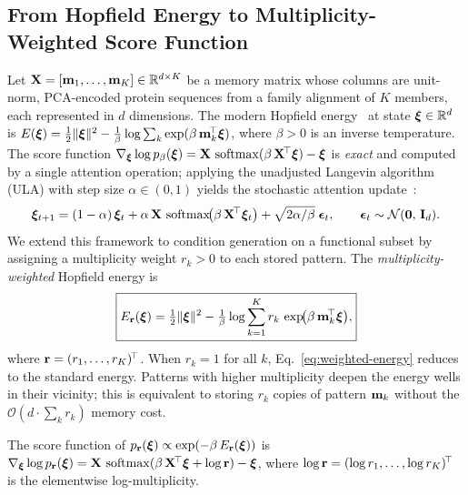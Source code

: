 \subsection{From Hopfield Energy to Multiplicity-Weighted Score Function}\label{sec:theory}

Let $\mathbf{X} = [\mathbf{m}_1, \ldots, \mathbf{m}_K] \in \mathbb{R}^{d \times K}$ be a memory matrix whose columns are
unit-norm, PCA-encoded protein sequences from a family alignment of $K$ members, each represented
in $d$ dimensions. The modern Hopfield energy~\cite{ramsauerHopfieldNetworksAll2021} at state
$\bm{\xi} \in \mathbb{R}^d$ is $E(\bm{\xi}) = \tfrac{1}{2}\|\bm{\xi}\|^{2} - \tfrac{1}{\beta}\log\sum_{k}\exp(\beta\,\mathbf{m}_{k}^{\!\top}\bm{\xi})$, where $\beta > 0$ is an inverse temperature. The score function
$\nabla_{\bm{\xi}}\log p_{\beta}(\bm{\xi}) = \mathbf{X}\,\operatorname{softmax}(\beta\,\mathbf{X}^{\!\top}\bm{\xi}) - \bm{\xi}$ is
\emph{exact} and computed by a single attention operation; applying the unadjusted Langevin
algorithm (ULA) with step size $\alpha \in (0,1)$ yields the stochastic attention
update~\cite{varnerSAProtein2026}:
\begin{equation}\label{eq:ula}
  \bm{\xi}_{t+1}
    = (1-\alpha)\,\bm{\xi}_{t}
    + \alpha\,\mathbf{X}\,\operatorname{softmax}\!\bigl(\beta\,\mathbf{X}^{\!\top}\bm{\xi}_{t}\bigr)
    + \sqrt{2\alpha/\beta}\;\bm{\epsilon}_{t},
  \qquad \bm{\epsilon}_{t} \sim \mathcal{N}(\mathbf{0},\,\mathbf{I}_{d}).
\end{equation}
We extend this framework to condition generation on a functional subset by assigning a
multiplicity weight $r_k > 0$ to each stored pattern. The \emph{multiplicity-weighted} Hopfield
energy is
\begin{equation}\label{eq:weighted-energy}
  \boxed{
  E_{\mathbf{r}}(\bm{\xi}) = \tfrac{1}{2}\|\bm{\xi}\|^{2}
    - \tfrac{1}{\beta}\log\sum_{k=1}^{K} r_k\,\exp\!\bigl(\beta\,\mathbf{m}_{k}^{\!\top}\bm{\xi}\bigr),}
\end{equation}
where $\mathbf{r} = (r_1, \ldots, r_K)^{\!\top}$.
When $r_k = 1$ for all $k$, Eq.~\eqref{eq:weighted-energy} reduces to the standard energy.
Patterns with higher multiplicity deepen the energy wells in their vicinity; this is equivalent
to storing $r_k$ copies of pattern $\mathbf{m}_k$ without the $\mathcal{O}(d \cdot \sum_k r_k)$
memory cost.

\begin{proposition}\label{prop:score}
The score function of $p_{\mathbf{r}}(\bm{\xi}) \propto \exp(-\beta\,E_{\mathbf{r}}(\bm{\xi}))$ is
$\nabla_{\bm{\xi}}\log p_{\mathbf{r}}(\bm{\xi}) = \mathbf{X}\,\operatorname{softmax}(\beta\,\mathbf{X}^{\!\top}\bm{\xi} + \log\mathbf{r}) - \bm{\xi}$,
where $\log\mathbf{r} = (\log r_1, \ldots, \log r_K)^{\!\top}$ is the elementwise log-multiplicity.
\end{proposition}

